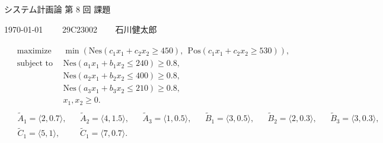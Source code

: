 \documentclass[uplatex, a4j, 11pt, fleqn, dvipdfmx]{article}
\begin{document}
\begin{center}
	{\Huge システム計画論 第 8 回 課題}
\end{center}

\begin{flushright}
	{\Large \today ~~~~ 29C23002 ~~~ 石川健太郎}
\end{flushright}

\begin{align}
	\begin{aligned}
		\text{maximize} ~~
		 & \min \left(
		\mathrm{Nes} \left( c_1 x_1 + c_2 x_2 \geq 450 \right), ~~
		\mathrm{Pos} \left( c_1 x_1 + c_2 x_2 \geq 530 \right)
		\right),
		\\
		\text{subject to} ~~
		 & \mathrm{Nes} \left( a_1 x_1 + b_1 x_2 \leq 240 \right) \geq 0.8,
		\\
		 & \mathrm{Nes} \left( a_2 x_1 + b_2 x_2 \leq 400 \right) \geq 0.8,
		\\
		 & \mathrm{Nes} \left( a_3 x_1 + b_3 x_2 \leq 210 \right) \geq 0.8,
		\\
		 & x_1, x_2 \geq 0.
	\end{aligned}
	\label{fom-1}
\end{align}
\begin{align}
	\begin{aligned}
		 & \tilde{A}_1 = \langle 2, 0.7 \rangle,
		 &                                       & \tilde{A}_2 = \langle 4, 1.5 \rangle,
		 &                                       & \tilde{A}_3 = \langle 1, 0.5 \rangle,
		 &                                       & \tilde{B}_1 = \langle 3, 0.5 \rangle,
		 &                                       & \tilde{B}_2 = \langle 2, 0.3 \rangle,
		 &                                       & \tilde{B}_3 = \langle 3, 0.3 \rangle,
		\\
		 & \tilde{C}_1 = \langle 5, 1 \rangle,
		 &                                       & \tilde{C}_1 = \langle 7, 0.7 \rangle.
	\end{aligned}
	\label{fom-2}
\end{align}
\end{document}

